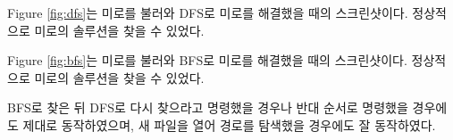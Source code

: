 Figure \ref{fig:dfs}는 미로를 불러와 DFS로 미로를 해결했을 때의 스크린샷이다.
정상적으로 미로의 솔루션을 찾을 수 있었다.

Figure \ref{fig:bfs}는 미로를 불러와 BFS로 미로를 해결했을 때의 스크린샷이다.
정상적으로 미로의 솔루션을 찾을 수 있었다.

BFS로 찾은 뒤 DFS로 다시 찾으라고 명령했을 경우나 반대 순서로 명령했을 경우에도 제대로 동작하였으며, 새 파일을 열어 경로를 탐색했을 경우에도 잘 동작하였다.